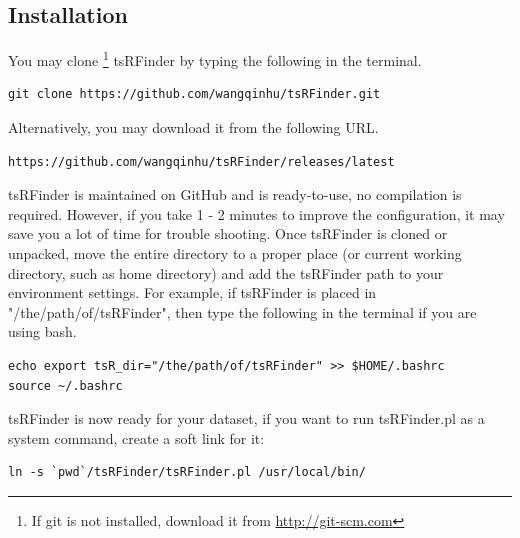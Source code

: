 \documentclass[11pt, a4paper]{article}
\begin{document}
\subsection{Installation}

You may clone \footnote{If git is not installed, download it from \url{http://git-scm.com}} tsRFinder by typing the following in the terminal.

{\footnotesize \begin{tcolorbox}[colback=blue!5!white,colframe=pink!75!black,title=Clone tsRFinder]
\begin{verbatim}
git clone https://github.com/wangqinhu/tsRFinder.git
\end{verbatim}
\end{tcolorbox}}

Alternatively, you may download it from the following URL.

{\footnotesize \begin{tcolorbox}[colback=blue!5!white,colframe=pink!75!black,title=Latest release of tsRFinder]
\begin{verbatim}
https://github.com/wangqinhu/tsRFinder/releases/latest
\end{verbatim}
\end{tcolorbox}}

tsRFinder is maintained on GitHub and is ready-to-use, no compilation is required. However, if you take 1 - 2 minutes to improve the configuration, it may save you a lot of time for trouble shooting. Once tsRFinder is cloned or unpacked, move the entire directory to a proper place (or current working directory, such as home directory) and add the tsRFinder path to your environment settings. For example, if tsRFinder is placed in "/the/path/of/tsRFinder", then type the following in the terminal if you are using bash.

{\footnotesize \begin{tcolorbox}[colback=blue!5!white,colframe=pink!75!black,title=Setup tsRFinder]
\begin{verbatim}
echo export tsR_dir="/the/path/of/tsRFinder" >> $HOME/.bashrc
source ~/.bashrc
\end{verbatim}
\end{tcolorbox}}

tsRFinder is now ready for your dataset, if you want to run tsRFinder.pl as a system command, create a soft link for it:

{\footnotesize \begin{tcolorbox}[colback=blue!5!white,colframe=pink!75!black,title=Make a soft link for tsRFinder.pl]
\begin{verbatim}
ln -s `pwd`/tsRFinder/tsRFinder.pl /usr/local/bin/
\end{verbatim}
\end{tcolorbox}}
\end{document}
